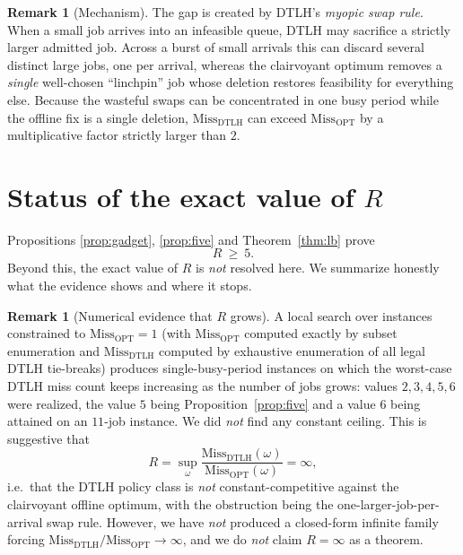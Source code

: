 \documentclass{amsart}
\theoremstyle{definition}
\newtheorem{remark}[theorem]{Remark}
\begin{document}
\begin{remark}[Mechanism]
The gap is created by DTLH's \emph{myopic swap rule}. When a small job arrives
into an infeasible queue, DTLH may sacrifice a strictly larger admitted job.
Across a burst of small arrivals this can discard several distinct large jobs,
one per arrival, whereas the clairvoyant optimum removes a \emph{single}
well-chosen ``linchpin'' job whose deletion restores feasibility for everything
else. Because the wasteful swaps can be concentrated in one busy period while the
offline fix is a single deletion, $\mathrm{Miss}_{\mathrm{DTLH}}$ can exceed
$\mathrm{Miss}_{\mathrm{OPT}}$ by a multiplicative factor strictly larger than
$2$.
\end{remark}

\section{Status of the exact value of $R$}

Propositions \ref{prop:gadget}, \ref{prop:five} and Theorem~\ref{thm:lb} prove
\[
R\ \ge\ 5 .
\]
Beyond this, the exact value of $R$ is \emph{not} resolved here. We summarize
honestly what the evidence shows and where it stops.

\begin{remark}[Numerical evidence that $R$ grows]\label{rem:grow}
A local search over instances constrained to $\mathrm{Miss}_{\mathrm{OPT}}=1$
(with $\mathrm{Miss}_{\mathrm{OPT}}$ computed exactly by subset enumeration and
$\mathrm{Miss}_{\mathrm{DTLH}}$ computed by exhaustive enumeration of all legal
DTLH tie-breaks) produces single-busy-period instances on which the worst-case
DTLH miss count keeps increasing as the number of jobs grows: values
$2,3,4,5,6$ were realized, the value $5$ being Proposition~\ref{prop:five} and a
value $6$ being attained on an $11$-job instance. We did \emph{not} find any
constant ceiling. This is suggestive that
\[
R=\sup_\omega
\frac{\mathrm{Miss}_{\mathrm{DTLH}}(\omega)}{\mathrm{Miss}_{\mathrm{OPT}}(\omega)}
=\infty,
\]
i.e.\ that the DTLH policy class is \emph{not} constant-competitive against the
clairvoyant offline optimum, with the obstruction being the
one-larger-job-per-arrival swap rule. However, we have \emph{not} produced a
closed-form infinite family forcing
$\mathrm{Miss}_{\mathrm{DTLH}}/\mathrm{Miss}_{\mathrm{OPT}}\to\infty$, and we do
\emph{not} claim $R=\infty$ as a theorem.
\end{remark}
\end{document}
